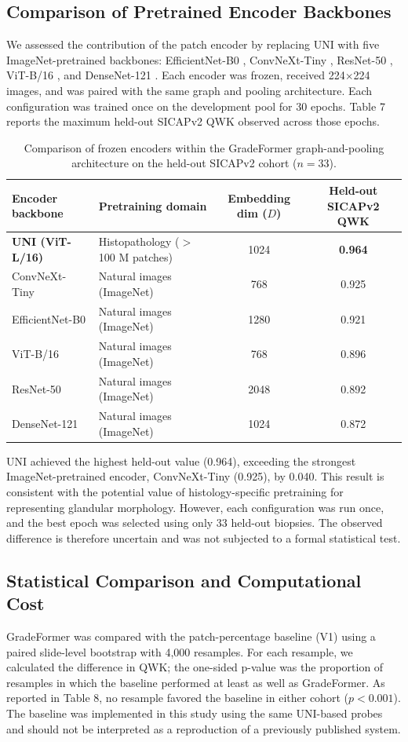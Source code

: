 \documentclass[11pt,a4paper]{article}
\begin{document}
\subsection{Comparison of Pretrained Encoder Backbones}
We assessed the contribution of the patch encoder by replacing UNI with five ImageNet-pretrained backbones: EfficientNet-B0 \cite{ref28}, ConvNeXt-Tiny \cite{ref29}, ResNet-50 \cite{ref30}, ViT-B/16 \cite{ref23}, and DenseNet-121 \cite{ref31}. Each encoder was frozen, received 224$\times$224 images, and was paired with the same graph and pooling architecture. Each configuration was trained once on the development pool for 30 epochs. Table 7 reports the maximum held-out SICAPv2 QWK observed across those epochs.


\begin{table}[H]
\centering
\small
\renewcommand{\arraystretch}{1.15}
\caption{Comparison of frozen encoders within the GradeFormer graph-and-pooling architecture on the held-out SICAPv2 cohort ($n = 33$).}
\label{tab:encoder_comparison}
\begin{tabularx}{\textwidth}{lXcc}
\toprule
\textbf{Encoder backbone} & \textbf{Pretraining domain} & \textbf{Embedding dim ($D$)} & \textbf{Held-out SICAPv2 QWK} \\
\midrule
\textbf{UNI (ViT-L/16)} & Histopathology ($>$100 M patches) & 1024 & \textbf{0.964} \\
ConvNeXt-Tiny & Natural images (ImageNet) & 768 & 0.925 \\
EfficientNet-B0 & Natural images (ImageNet) & 1280 & 0.921 \\
ViT-B/16 & Natural images (ImageNet) & 768 & 0.896 \\
ResNet-50 & Natural images (ImageNet) & 2048 & 0.892 \\
DenseNet-121 & Natural images (ImageNet) & 1024 & 0.872 \\
\bottomrule
\end{tabularx}
\end{table}

UNI achieved the highest held-out value (0.964), exceeding the strongest ImageNet-pretrained encoder, ConvNeXt-Tiny (0.925), by 0.040. This result is consistent with the potential value of histology-specific pretraining for representing glandular morphology. However, each configuration was run once, and the best epoch was selected using only 33 held-out biopsies. The observed difference is therefore uncertain and was not subjected to a formal statistical test.


\subsection{Statistical Comparison and Computational Cost}
GradeFormer was compared with the patch-percentage baseline (V1) using a paired slide-level bootstrap with 4,000 resamples. For each resample, we calculated the difference in QWK; the one-sided p-value was the proportion of resamples in which the baseline performed at least as well as GradeFormer. As reported in Table 8, no resample favored the baseline in either cohort ($p < 0.001$). The baseline was implemented in this study using the same UNI-based probes and should not be interpreted as a reproduction of a previously published system.
\end{document}
